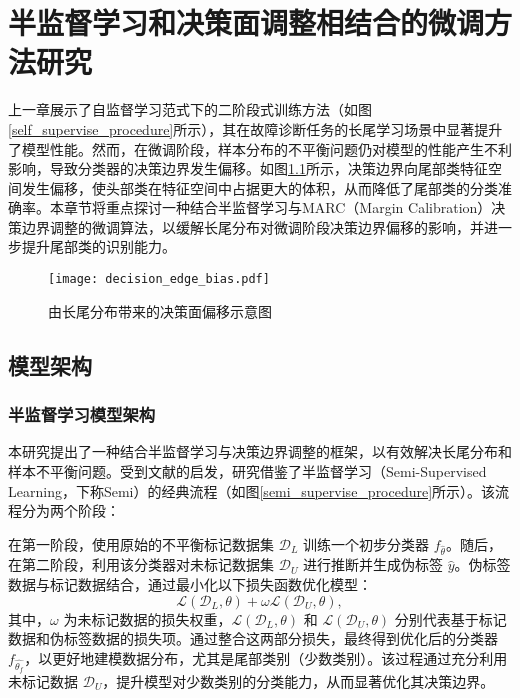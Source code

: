 \documentclass[master]{thesis-uestc}
\begin{document}
\chapter{半监督学习和决策面调整相结合的微调方法研究}
上一章展示了自监督学习范式下的二阶段式训练方法（如图\ref{self_supervise_procedure}所示），其在故障诊断任务的长尾学习场景中显著提升了模型性能。然而，在微调阶段，样本分布的不平衡问题仍对模型的性能产生不利影响，导致分类器的决策边界发生偏移。如图\ref{decision_edge_bias}所示，决策边界向尾部类特征空间发生偏移，使头部类在特征空间中占据更大的体积，从而降低了尾部类的分类准确率。本章节将重点探讨一种结合半监督学习与MARC（Margin Calibration）决策边界调整的微调算法，以缓解长尾分布对微调阶段决策边界偏移的影响，并进一步提升尾部类的识别能力。

\begin{figure}[h]
    \centering
    \texttt{[image: decision\_edge\_bias.pdf]}
    \caption{由长尾分布带来的决策面偏移示意图}
    \label{decision_edge_bias}
\end{figure}

\section{模型架构}
\subsection{半监督学习模型架构}
本研究提出了一种结合半监督学习与决策边界调整的框架，以有效解决长尾分布和样本不平衡问题。受到文献\cite{yang2020rethinking,wang2023margin}的启发，研究借鉴了半监督学习（Semi-Supervised Learning，下称Semi）的经典流程（如图\ref{semi_supervise_procedure}所示）。该流程分为两个阶段：

在第一阶段，使用原始的不平衡标记数据集 $\mathcal{D}_{L}$ 训练一个初步分类器 $f_{\hat{\theta}}$。随后，在第二阶段，利用该分类器对未标记数据集 $\mathcal{D}_{U}$ 进行推断并生成伪标签 $\hat{y}$。伪标签数据与标记数据结合，通过最小化以下损失函数优化模型：
\begin{equation} 
    \mathcal{L}(\mathcal{D}_{L},\theta) + \omega \mathcal{L}(\mathcal{D}_{U},\theta), 
\end{equation}
其中，$\omega$ 为未标记数据的损失权重，$\mathcal{L}(\mathcal{D}_{L},\theta)$ 和 $\mathcal{L}(\mathcal{D}_{U},\theta)$ 分别代表基于标记数据和伪标签数据的损失项。通过整合这两部分损失，最终得到优化后的分类器 $f_{\hat{\theta_f}}$，以更好地建模数据分布，尤其是尾部类别（少数类别）。该过程通过充分利用未标记数据 $\mathcal{D}_{U}$，提升模型对少数类别的分类能力，从而显著优化其决策边界。
\end{document}
